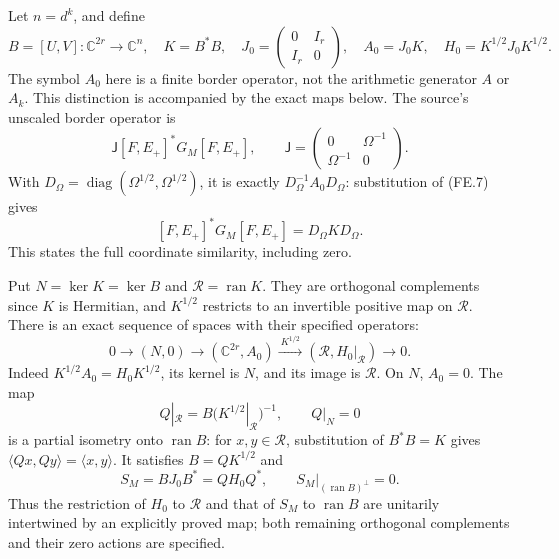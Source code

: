 Let \(n=d^k\), and define
\[
 B=[U,V]:\mathbb C^{2r}\to\mathbb C^n,\quad
 K=B^*B,\quad J_0=\begin{pmatrix}0&I_r\\I_r&0\end{pmatrix},
 \quad A_0=J_0K,\quad H_0=K^{1/2}J_0K^{1/2}.
 \tag{FE.12}
\]
The symbol \(A_0\) here is a finite border operator, not the
arithmetic generator \(A\) or \(A_k\).  This distinction is
accompanied by the exact maps below.  The source's unscaled border
operator is
\[
 \mathsf J[F,E_+]^*G_M[F,E_+],\qquad
 \mathsf J=\begin{pmatrix}0&\Omega^{-1}\\\Omega^{-1}&0\end{pmatrix}.
\]
With \(D_\Omega=\operatorname{diag}(\Omega^{1/2},\Omega^{1/2})\),
it is exactly \(D_\Omega^{-1}A_0D_\Omega\): substitution of
(FE.7) gives
\[
 [F,E_+]^*G_M[F,E_+]=D_\Omega K D_\Omega.
\]
This states the full coordinate similarity, including zero.

Put \(N=\ker K=\ker B\) and \(\mathcal R=\operatorname{ran}K\).
They are orthogonal complements since \(K\) is Hermitian, and
\(K^{1/2}\) restricts to an invertible positive map on
\(\mathcal R\).  There is an exact sequence of spaces with
their specified operators:
\[
 0\longrightarrow(N,0)\longrightarrow(\mathbb C^{2r},A_0)
  \xrightarrow{\ K^{1/2}\ }(\mathcal R,H_0|_{\mathcal R})
  \longrightarrow0.                                    \tag{FE.13}
\]
Indeed \(K^{1/2}A_0=H_0K^{1/2}\), its kernel is \(N\),
and its image is \(\mathcal R\).  On \(N\), \(A_0=0\).
The map
\[
 Q|_{\mathcal R}=B(K^{1/2}|_{\mathcal R})^{-1},\qquad
 Q|_N=0                                                 \tag{FE.14}
\]
is a partial isometry onto \(\operatorname{ran}B\): for
\(x,y\in\mathcal R\), substitution of \(B^*B=K\)
gives \(\langle Qx,Qy\rangle=\langle x,y\rangle\).
It satisfies \(B=QK^{1/2}\) and
\[
 S_M=BJ_0B^*=QH_0Q^*,\qquad
 S_M|_{(\operatorname{ran}B)^\perp}=0.                   \tag{FE.15}
\]
Thus the restriction of \(H_0\) to \(\mathcal R\)
and that of \(S_M\) to \(\operatorname{ran}B\) are
unitarily intertwined by an explicitly proved map; both remaining
orthogonal complements and their zero actions are specified.

